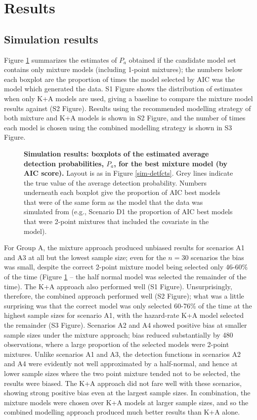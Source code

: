 \documentclass[10pt]{article}
\begin{document}
  
\section*{Results}

\subsection*{Simulation results}

Figure \ref{sim-boxplots} summarizes the estimates of $P_a$ obtained if the candidate model set contains only mixture models (including 1-point mixtures); the numbers below each boxplot are the proportion of times the model selected by AIC was the model which generated the data. S1 Figure shows the distribution of estimates when only K+A models are used, giving a baseline to compare the mixture model results against (S2 Figure). Results using the recommended modelling strategy of both mixture and K+A models is shown in S2 Figure, and the number of times each model is chosen using the combined modelling strategy is shown in S3 Figure.

\begin{figure}[!ht]
\centering
\caption{
{\bf Simulation results: boxplots of the estimated average detection probabilities, $P_a$, for the best mixture model (by AIC score).} Layout is as in Figure \ref{sim-detfcts}. Grey lines indicate the true value of the average detection probability. Numbers underneath each boxplot give the proportion of AIC best models that were of the same form as the model that the data was simulated from (e.g., Scenario D1 the proportion of AIC best models that were 2-point mixtures that included the covariate in the model).
}
\label{sim-boxplots}
\end{figure}

For Group A, the mixture approach produced unbiased results for scenarios A1 and A3 at all but the lowest sample size; even for the $n=30$ scenarios the bias was small, despite the correct 2-point mixture model being selected only 46-60\% of the time (Figure \ref{sim-boxplots} -- the half normal model was selected the remainder of the time).  The K+A approach also performed well (S1 Figure). Unsurprisingly, therefore, the combined approach performed well (S2 Figure); what was a little surprising was that the correct model was only selected 60-76\% of the time at the highest sample sizes for scenario A1, with the hazard-rate K+A model selected the remainder (S3 Figure). Scenarios A2 and A4 showed positive bias at smaller sample sizes under the mixture approach; bias reduced substantially by 480 observations, where a large proportion of the selected models were 2-point mixtures. Unlike scenarios A1 and A3, the detection functions in scenarios A2 and A4 were evidently not well approximated by a half-normal, and hence at lower sample sizes where the two point mixture tended not to be selected, the results were biased. The K+A approach did not fare well with these scenarios, showing strong positive bias even at the largest sample sizes. In combination, the mixture models were chosen over K+A models at larger sample sizes, and so the combined modelling approach produced much better results than K+A alone.  
\end{document}
